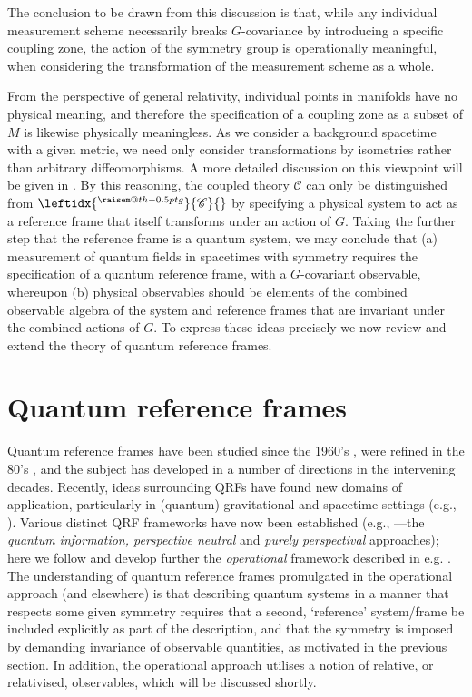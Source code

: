 \documentclass[sn-mathphys-num]{sn-jnl}%
\makeatletter
\newcommand{\raisemath}[1]{\mathpalette{\raisem@th{#1}}}
\newcommand{\raisem@th}[3]{\raisebox{#1}{$#2#3$}}
\newcommand{\act}[2]{\leftidx{^{\raisemath{-0.5pt}{#1}}}{#2}{}}
\newcommand{\Cf}{\mathscr{C}}
\numberwithin{equation}{section}
\theoremstyle{thmstyleone}%
\theoremstyle{thmstyletwo}%
\theoremstyle{thmstylethree}%
\makeatother
\begin{document}
 
The conclusion to be drawn from this discussion is that, while
any individual measurement scheme necessarily breaks $G$-covariance by introducing a specific coupling zone, the action of the symmetry group is operationally meaningful, when considering the transformation of the measurement scheme as a whole. 

From the perspective of general relativity, individual points in manifolds have no physical meaning, and therefore the specification of a coupling zone as a subset of $M$ is likewise physically meaningless. As we consider a background spacetime with a given metric, we need only consider transformations by isometries rather than arbitrary diffeomorphisms. A more detailed discussion on this viewpoint will be given in \cite{type_reductionII}. 
By this reasoning, the coupled theory
$\Cf$ can only be distinguished from $\act{g}{\Cf}$ by specifying a physical system to act as a reference frame that itself transforms under an action of $G$. Taking the further step that the reference frame is a quantum system, we may conclude that
(a) measurement of quantum fields in spacetimes with symmetry requires the specification of a quantum reference frame, with a $G$-covariant observable, whereupon (b) physical observables should be elements of the combined observable algebra of the system and reference frames that are invariant under the combined actions of $G$. To express these ideas precisely we now review and extend the theory of quantum reference frames.  


\section{Quantum reference frames}\label{Sec:QRFs}

Quantum reference frames have been studied since the 1960's \cite{Aharonov:1967zza}, were refined in the 80's \cite{Aharonov:1984zz}, and the subject has developed in a number of directions in the intervening decades. Recently, ideas surrounding QRFs have found new domains of application, particularly in (quantum) gravitational and spacetime settings (e.g., \cite{goeller2022diffeomorphism,carrozza2022edge,kabel2024identification,de2023quantum1,de2022quantum}). Various distinct QRF frameworks have now been established (e.g., \cite{Bartlett2007,Vanrietvelde:2018pgb,giacomini2019quantum}---the \emph{quantum information, perspective neutral} and \emph{purely perspectival} approaches); here we follow and develop further the \emph{operational} framework described in e.g. \cite{Loveridge2017a,carette2023operational}. The understanding of quantum reference frames promulgated in the operational approach (and elsewhere) is that describing quantum systems in a manner that respects some given symmetry requires that a second, `reference' system/frame be included explicitly as part of the description, and that the symmetry is imposed by demanding invariance of observable quantities, as motivated in the previous section. In addition, the operational approach utilises a notion of relative, or relativised, observables, which will be discussed shortly.
 
\end{document}

